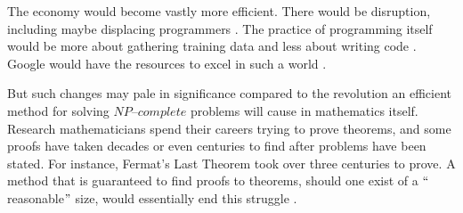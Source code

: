 \documentclass[a4paper,UKenglish,cleveref, autoref]{lipics-v2019}
\begin{document}
The economy would become vastly more efficient. There would be disruption, including maybe displacing programmers \cite{IMP95}. The practice of programming itself would be more about gathering training data and less about writing code \cite{IMP95}. Google would have the resources to excel in such a world \cite{IMP95}.

But such changes may pale in significance compared to the revolution an efficient method for solving $\textit{NP--complete}$ problems will cause in mathematics itself. Research mathematicians spend their careers trying to prove theorems, and some proofs have taken decades or even centuries to find after problems have been stated. For instance, Fermat's Last Theorem took over three centuries to prove. A method that is guaranteed to find proofs to theorems, should one exist of a $``$reasonable$"$ size, would essentially end this struggle \cite{CS00}.



\end{document}
